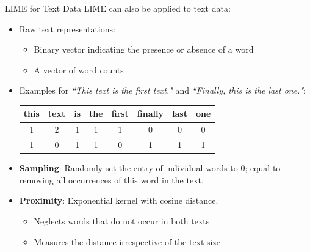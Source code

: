 \documentclass[11pt,compress,t,notes=noshow, aspectratio=169, xcolor=table]{beamer}
\begin{document}
\begin{frame}{LIME for Text Data }
    LIME can also be applied to text data: 
	\begin{itemize}
		\item Raw text representations: 
		\begin{itemize}
		    \item Binary vector indicating the presence or absence of a word 
		    \item A vector of word counts
		\end{itemize}
		\item Examples for \textit{``This text is the first text."} and \textit{``Finally, this is the last one."}:
		\begin{center}
			\begin{tabular}{c|c|c|c|c|c|c|c} 
				this & text & is & the & first & finally & last & one \\ 
				\hline
				1 & 2 & 1 & 1 & 1 & 0 & 0 & 0 \\
				1 & 0 & 1 & 1 & 0 & 1 & 1 & 1 \\
			\end{tabular}
		\end{center} 
		\item \textbf{Sampling}: Randomly set the entry of individual words to $0$; equal to removing all occurrences of this word in the text. 
		\item \textbf{Proximity}: Exponential kernel with cosine distance. 
		\begin{itemize}
		    \item Neglects words that do not occur in both texts 
		    \item Measures the distance irrespective of the text size
		\end{itemize}
	\end{itemize}
\end{frame}
	
\end{document}
